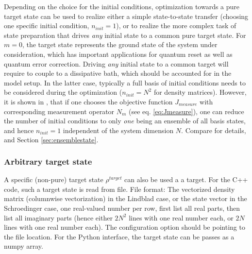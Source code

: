 \documentclass[11pt]{article}
\begin{document}
Depending on the choice for the initial conditions, optimization towards a pure target state can be used to realize either a simple state-to-state transfer (choosing one specific initial condition, $n_{init}=1$), or to realize the more complex task of state preparation that drives \textit{any} initial state to a common pure target state. 
For $m=0$, the target state represents the ground state of the system under consideration, which has important applications for quantum reset as well as quantum error correction. Driving \textit{any} initial state to a common target will require to couple to a dissipative bath, which should be accounted for in the model setup. In the latter case, typically a full basis of initial conditions needs to be considered during the optimization ($n_{init}=N^2$ for density matrices). However, it is shown in \cite{guenther2021quantum}, that if one chooses the objective function $J_{measure}$ with corresponding measurement operator $N_m$ (see eq. \eqref{eq:Jmeasure}), one can reduce the number of initial conditions to only \textit{one} being an ensemble of all basis states, and hence $n_{init}=1$ independent of the system dimension $N$. Compare \cite{guenther2021quantum} for details, and Section \ref{sec:ensemblestate}. 



\subsubsection{Arbitrary target state}
A specific (non-pure) target state $\rho^{target}$ can also be used a a target. For the C++ code, such a target state is read from file. File format: The vectorized density matrix (columnwise vectorization) in the Lindblad case, or the state vector in the Schroedinger case, one real-valued number per row, first list all real parts, then list all imaginary parts (hence either $2N^2$ lines with one real number each, or $2N$ lines with one real number each). The configuration option should be pointing to the file location. For the Python interface, the target state can be passes as a numpy array. 
 
\end{document}
